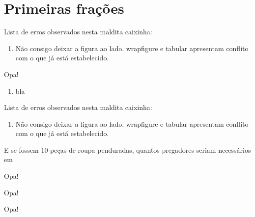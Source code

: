 \documentclass[a4,12pt]{book}
\begin{document}
\chapter{Primeiras frações}

\begin{refletindo}
  Lista de erros observados nesta maldita caixinha:
  \begin{enumerate}
   \item Não consigo deixar a figura ao lado. wrapfigure e tabular apresentam conflito com o que já está estabelecido. 
  \end{enumerate}
\end{refletindo}


\begin{refletindo}
 Opa!
 \begin{enumerate}
  \item bla
 \end{enumerate}
\end{refletindo}



\begin{refletindo}
Lista de erros observados nesta maldita caixinha:

\begin{enumerate}
 \item Não consigo deixar a figura ao lado. wrapfigure e tabular apresentam conflito com o que já está estabelecido.
\end{enumerate}
\end{refletindo}

E se fossem 10 peças de roupa penduradas, quantos pregadores seriam necessários em

\lipsum[1]

\begin{refletindo}
 Opa!
 \lipsum[1]
\end{refletindo}

\lipsum[2-4]

\begin{refletindo}
 Opa!
 \lipsum[5]
\end{refletindo}

\lipsum
\begin{refletindo}
 Opa!
 \lipsum[1]
\end{refletindo}

\lipsum[2-4]




\end{document}
